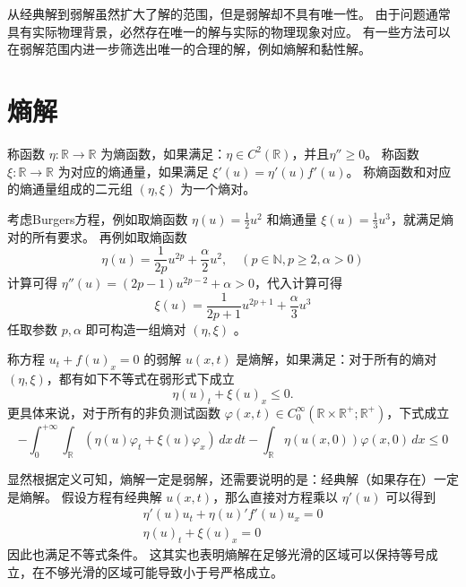 从经典解到弱解虽然扩大了解的范围，但是弱解却不具有唯一性。
由于问题通常具有实际物理背景，必然存在唯一的解与实际的物理现象对应。
有一些方法可以在弱解范围内进一步筛选出唯一的合理的解，例如熵解和黏性解。

\section{熵解}

\begin{definition}[熵函数和熵通量]
    称函数 $\eta: \mathbb{R} \to \mathbb{R}$ 为熵函数，如果满足：$\eta \in C^2(\mathbb{R})$，并且$\eta'' \ge 0$。
    称函数 $\xi: \mathbb{R} \to \mathbb{R}$ 为对应的熵通量，如果满足 $\xi'(u) = \eta'(u) f'(u)$。
    称熵函数和对应的熵通量组成的二元组 $(\eta,\xi)$ 为一个熵对。
\end{definition}

\begin{example}
    考虑Burgers方程，例如取熵函数 $\eta(u) = \frac{1}{2} u^2$ 和熵通量 $\xi(u) = \frac{1}{3} u^3$，就满足熵对的所有要求。
    再例如取熵函数
    \[
        \eta(u) = \frac{1}{2p} u^{2p} + \frac{\alpha}2 u^2,\quad (p \in \mathbb{N}, p \ge2, \alpha > 0)
    \]
    计算可得 $\eta''(u) = (2p-1) u^{2p-2} + \alpha > 0$，代入计算可得
    \[
        \xi(u) = \frac{1}{2p+1} u^{2p+1} + \frac{\alpha}3 u^3
    \]
    任取参数 $p,\alpha$ 即可构造一组熵对 $(\eta,\xi)$ 。
\end{example}

\begin{definition}
    称方程 $u_t + f(u)_x = 0$ 的弱解 $u(x,t)$ 是熵解，如果满足：对于所有的熵对 $(\eta,\xi)$，都有如下不等式在弱形式下成立
    \[
        \eta(u)_t + \xi(u)_x \le 0.
    \]
    更具体来说，对于所有的非负测试函数 $\varphi(x,t) \in C_0^\infty(\mathbb{R} \times \mathbb{R}^+;\mathbb{R}^+)$，下式成立
    \[
        - \int_0^{+\infty} \int_{\mathbb{R}}(\eta(u) \varphi_t + \xi(u) \varphi_x) \,dx\,dt
        - \int_{\mathbb{R}} \eta(u(x,0))\varphi(x,0)\,dx \le 0
    \]
\end{definition}


显然根据定义可知，熵解一定是弱解，还需要说明的是：经典解（如果存在）一定是熵解。
假设方程有经典解 $u(x,t)$，那么直接对方程乘以 $\eta'(u)$ 可以得到
\begin{gather*}
    \eta'(u) u_t + \eta(u)' f'(u) u_x = 0 \\
    \eta(u)_t + \xi(u)_x = 0
\end{gather*}
因此也满足不等式条件。
这其实也表明熵解在足够光滑的区域可以保持等号成立，在不够光滑的区域可能导致小于号严格成立。

